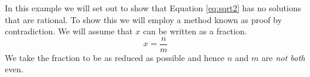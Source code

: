 \begin{example}\label{ex:gaps}
In this example we will set out to show that Equation \ref{eq:sqrt2} has no
solutions that are rational. To show this we will employ a method known as
proof by contradiction. We will assume that $x$ can be written as a fraction.
\begin{equation}\label{eq:sqrt2-is-rational}
    x = \frac{n}{m}
\end{equation}
We take the fraction to be as reduced as possible and hence $n$ and $m$ are \emph{not both} even.
\end{example}
